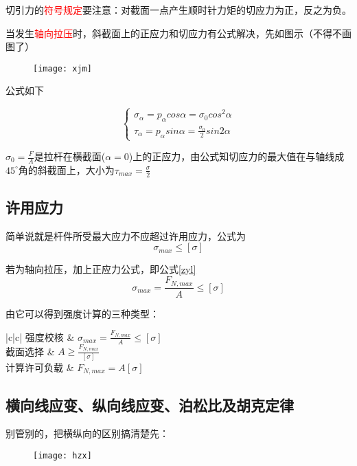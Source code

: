 \documentclass[10pt,a4paper]{ctexart}
\begin{document}
切引力的\textcolor{red}{符号规定}要注意：对截面一点产生顺时针力矩的切应力为正，反之为负。

当发生\textcolor{red}{轴向拉压}时，斜截面上的正应力和切应力有公式解决，先如图示（不得不画图了）
\begin{figure}[htp]%
	\centering
	\texttt{[image: xjm]}
\end{figure}

公式如下

\begin{equation}
	\begin{cases}
		\sigma_\alpha=p_\alpha cos\alpha =\sigma_0 cos^2\alpha\\
		\tau_\alpha=p_\alpha sin\alpha  = \frac{\sigma_0}{2}sin2\alpha
	\end{cases}
\end{equation}

$\sigma_0=\frac{F}{A}$是拉杆在横截面($\alpha=0$)上的正应力，由公式知切应力的最大值在与轴线成$45^{\circ}$角的斜截面上，大小为$\tau_{max}=\frac{\sigma}{2}$
\subsection{许用应力}
简单说就是杆件所受最大应力不应超过许用应力，公式为
\begin{equation}
	\sigma_{max}\leqslant\left[\sigma\right]%
\end{equation}
\par 若为轴向拉压，加上正应力公式，即公式\ref{zyl}%
\begin{equation}
	\sigma_{max}=\frac{F_{N,max}}{A}\leqslant\left[\sigma\right]
\end{equation}
\par
由它可以得到强度计算的三种类型：

\begin{table}[h]
	\centering
	\begin{tblr}{|c|c|}%
		\hline
		强度校核 & $\sigma_{max}=\frac{F_{N,max}}{A}\leqslant\left[\sigma\right]$ \\
		\hline
		截面选择 & $A\geqslant\frac{F_{N,max}}{\left[\sigma\right]}$\\
		\hline
		计算许可负载 & $F_{N,max}=A\left[\sigma\right]$\\
		\hline
	\end{tblr}
\end{table}


\subsection{横向线应变、纵向线应变、泊松比及胡克定律}
别管别的，把横纵向的区别搞清楚先：
\begin{figure}[htp]%
	\centering
	\texttt{[image: hzx]}
\end{figure}
\end{document}
